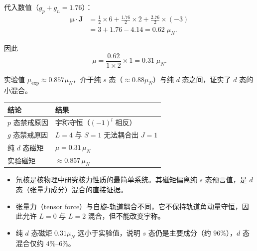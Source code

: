 \begin{derivationbox}[标准解题过程]
代入数值（$g_p+g_n=1.76$）：
\begin{align*}
\boldsymbol\mu\cdot\mathbf{J}&=\frac12\times6+\frac{1.76}{2}\times2+\frac{2.76}{2}\times(-3)\\
&=3+1.76-4.14=0.62\;\mu_N.
\end{align*}

因此
\begin{equation}
\boxed{\mu=\frac{0.62}{1\times2}\times1=0.31\;\mu_N.}
\end{equation}

实验值 $\mu_{\text{exp}}\approx0.857\mu_N$，介于纯 $s$ 态（$\approx0.88\mu_N$）与纯 $d$ 态之间，证实了 $d$ 态的小混合。
\end{derivationbox}

\begin{formulabox}[答案汇总]
\begin{center}
\begin{tabular}{ll}
\toprule
\textbf{结论} & \textbf{结果} \\
\midrule
$p$ 态禁戒原因 & 宇称守恒（$(-1)^l$ 相反） \\
$g$ 态禁戒原因 & $L=4$ 与 $S=1$ 无法耦合出 $J=1$ \\
纯 $d$ 态磁矩 & $\mu=0.31\,\mu_N$ \\
实验磁矩 & $\approx0.857\,\mu_N$ \\
\bottomrule
\end{tabular}
\end{center}
\end{formulabox}

\begin{insightbox}[物理图像]
\begin{itemize}
    \item 氘核是核物理中研究核力性质的最简单系统。其磁矩偏离纯 $s$ 态预言值，是 $d$ 态（张量力成分）混合的直接证据。
    \item 张量力（tensor force）与自旋-轨道耦合不同，它不保持轨道角动量守恒，因此允许 $L=0$ 与 $L=2$ 混合，但不能改变宇称。
    \item 纯 $d$ 态磁矩 $0.31\mu_N$ 远小于实验值，说明 $s$ 态仍是主要成分（约 $96\%$），$d$ 态混合仅约 $4\%$--$6\%$。
\end{itemize}
\end{insightbox}
